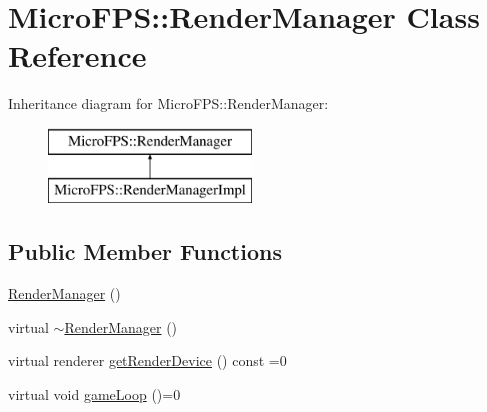 \hypertarget{class_micro_f_p_s_1_1_render_manager}{
\section{MicroFPS::RenderManager Class Reference}
\label{d2/dad/class_micro_f_p_s_1_1_render_manager}
}
Inheritance diagram for MicroFPS::RenderManager:\begin{figure}[H]
\begin{center}
\leavevmode
\includegraphics[height=2.000000cm]{d2/dad/class_micro_f_p_s_1_1_render_manager}
\end{center}
\end{figure}
\subsection*{Public Member Functions}
\begin{DoxyCompactItemize}
\item 
\hyperlink{class_micro_f_p_s_1_1_render_manager_aa5cfdf42a7aeed598d8cd6b406ba2224}{RenderManager} ()
\item 
virtual \hyperlink{class_micro_f_p_s_1_1_render_manager_aee2394d07bc912d3165fe4dbd4a456dd}{$\sim$RenderManager} ()
\item 
virtual renderer \hyperlink{class_micro_f_p_s_1_1_render_manager_acb0e88bc424463200c4bdf451ea3c3ad}{getRenderDevice} () const =0
\item 
virtual void \hyperlink{class_micro_f_p_s_1_1_render_manager_ab6de424a062e8abb4a5561463e2e8f5d}{gameLoop} ()=0
\end{DoxyCompactItemize}



